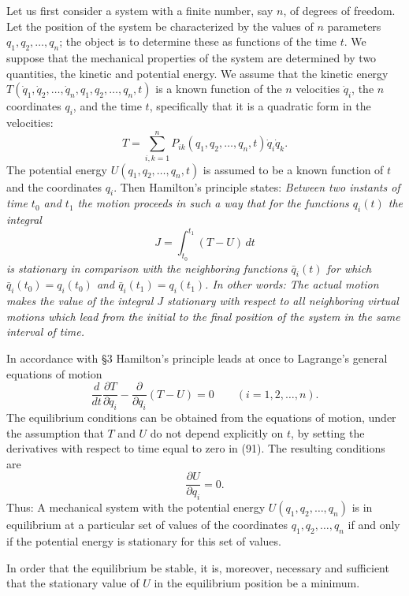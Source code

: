 Let us first consider a system with a finite number, say $n$, of degrees of freedom. Let the position of the system be characterized by the values of $n$ parameters $q_1,q_2,\ldots,q_n$; the object is to determine these as functions of the time $t$. We suppose that the mechanical properties of the system are determined by two quantities, the kinetic and potential energy. We assume that the kinetic energy $T(\dot q_1,\dot q_2,\ldots,\dot q_n,q_1,q_2,\ldots,q_n,t)$ is a known function of the $n$ velocities $\dot q_i$, the $n$ coordinates $q_i$, and the time $t$, specifically that it is a quadratic form in the velocities:
\[
T=\sum_{i,k=1}^n P_{ik}(q_1,q_2,\ldots,q_n,t)\dot q_i\dot q_k.
\]
The potential energy $U(q_1,q_2,\ldots,q_n,t)$ is assumed to be a known function of $t$ and the coordinates $q_i$. Then Hamilton's principle states: \emph{Between two instants of time $t_0$ and $t_1$ the motion proceeds in such a way that for the functions $q_i(t)$ the integral}
\[
J=\int_{t_0}^{t_1}(T-U)\,dt
\]
\emph{is stationary in comparison with the neighboring functions $\bar q_i(t)$ for which $\bar q_i(t_0)=q_i(t_0)$ and $\bar q_i(t_1)=q_i(t_1)$. In other words: The actual motion makes the value of the integral $J$ stationary with respect to all neighboring virtual motions which lead from the initial to the final position of the system in the same interval of time.}

In accordance with \S3 Hamilton's principle leads at once to Lagrange's general equations of motion
\begin{equation}\tag{91}
\frac{d}{dt}\frac{\partial T}{\partial\dot q_i}-\frac{\partial}{\partial q_i}(T-U)=0\qquad(i=1,2,\ldots,n).
\end{equation}
The equilibrium conditions can be obtained from the equations of motion, under the assumption that $T$ and $U$ do not depend explicitly on $t$, by setting the derivatives with respect to time equal to zero in (91). The resulting conditions are
\begin{equation}\tag{92}
\frac{\partial U}{\partial q_i}=0.
\end{equation}
Thus: A mechanical system with the potential energy $U(q_1,q_2,\ldots,q_n)$ is in equilibrium at a particular set of values of the coordinates $q_1,q_2,\ldots,q_n$ if and only if the potential energy is stationary for this set of values.

In order that the equilibrium be stable, it is, moreover, necessary and sufficient that the stationary value of $U$ in the equilibrium position be a minimum.


